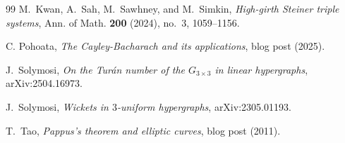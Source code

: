 \documentclass[11pt]{article}
\theoremstyle{definition}
\theoremstyle{remark}
\begin{document}
\begin{thebibliography}{99}
M.~Kwan, A.~Sah, M.~Sawhney, and M.~Simkin,
\emph{High-girth Steiner triple systems},
Ann. of Math. \textbf{200} (2024), no.~3, 1059--1156.

C. Pohoata,
\newblock \emph{The Cayley-Bacharach and its applications},
\newblock blog post (2025).


J.~Solymosi,
\newblock \emph{On the Tur\'an number of the $G_{3\times 3}$ in linear hypergraphs},
\newblock arXiv:2504.16973.

J.~Solymosi,
\newblock \emph{Wickets in $3$-uniform hypergraphs},
\newblock arXiv:2305.01193.


T.~Tao,
\newblock \emph{Pappus's theorem and elliptic curves},
\newblock blog post (2011).

\end{thebibliography}
\end{document}
